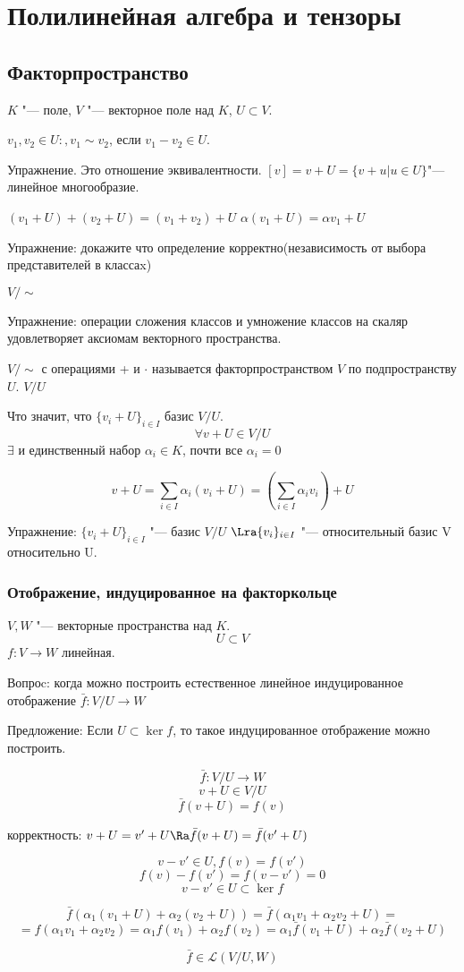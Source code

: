 ﻿\chapter{Полилинейная алгебра и тензоры}
\section{Факторпространство}
$K$ "--- поле, $V$ "--- векторное поле над $K$, $U \subset V$.

$v_1, v_2 \in U \colon ,v_1 \sim v_2$, если $v_1 - v_2 \in U$. 

Упражнение. Это отношение эквивалентности. 
$[v] = v + U = \{v + u| u \in U\}$"--- линейное многообразие. 

$(v_1 + U) + (v_2 + U) = (v_1 + v_2) + U$
$\alpha(v_1 + U) = \alpha v_1 + U$

Упражнение: докажите что определение корректно(независимость от выбора представителей в классаx)

$V/\sim$

Упражнение: операции сложения классов и умножение классов на скаляр удовлетворяет аксиомам векторного пространства.

$V/\sim$ с операциями + и $\cdot$ называется факторпространством $V$ по подпространству $U$. $V/U$ 

Что значит, что $\{v_i + U\}_{i \in I}$ базис $V/U$.
$$\forall v + U \in V/U$$
$\exists$ и единственный набор $\alpha_i \in K$, почти все $\alpha_i = 0$

$$v + U = \sum_{i \in I}\alpha_i(v_i + U) = (\sum_{i \in I}\alpha_i v_i) + U $$


Упражнение:
$\{v_i + U\}_{i \in I}$  "--- базис $V/U$
$\Lra \{v_i\}_{i \in I}$ "--- относительный базис V относительно U.

\subsection{Отображение, индуцированное на факторкольце}
    $V, W$ "--- векторные пространства над $K$.
    $$U \subset V$$
    $ f \colon V \to W$ линейная. 
    
    Вопроc: когда можно построить естественное линейное индуцированное отображение $\bar f \colon  V / U \to W$

    Предложение: Если $U \subset \ker f$, то такое индуцированное отображение можно построить. 

    $$\bar f \colon V/U \to W$$
    $$v + U \in V/U$$
    $$\bar f(v + U) = f(v)$$

    корректность: $v + U = v' + U \Ra \bar f(v + U) = \bar f (v' + U)$

    $$v - v' \in U, f(v) = f(v')$$
    $$f(v) - f(v') = f(v - v' ) = 0$$
    $$v - v' \in U \subset \ker f $$

    $$\bar f(\alpha_1(v_1 + U) + \alpha_2(v_2 + U)) = \bar f(\alpha_1 v_1 + \alpha_2 v_2 + U) = $$
    $$= f(\alpha_1 v_1 + \alpha_2 v_2) = \alpha_1 f(v_1) + \alpha_2 f(v_2) = \alpha_1 \bar f(v_1 + U) + \alpha_2\bar f(v_2 + U) $$

    $$\bar f \in \mathcal{L}(V/U, W)$$


